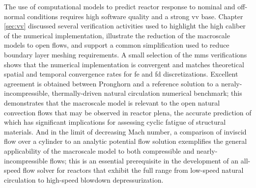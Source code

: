 The use of computational models to predict reactor response to nominal and off-normal conditions requires high software quality and a strong \gls{vv} base. Chapter \ref{sec:vv} discussed several verification activities used to highlight the high caliber of the numerical implementation, illustrate the reduction of the macroscale models to open flows, and support a common simplification used to reduce boundary layer meshing requirements. A small selection of the \gls{mms} verifications shows that the numerical implementation is convergent and matches theoretical spatial and temporal convergence rates for \gls{fe} and \gls{fd} discretizations. Excellent agreement is obtained between Pronghorn and a reference solution to a neraly-incompressible, thermally-driven natural circulation numerical benchmark; this demonstrates that the macroscale model is relevant to the open natural convection flows that may be observed in reactor plena, the accurate prediction of which has significant implications for assessing cyclic fatigue of structural materials. And in the limit of decreasing Mach number, a comparison of inviscid flow over a cylinder to an analytic potential flow solution exemplifies the general applicability of the macroscale model to both compressible and nearly-incompressible flows; this is an essential prerequisite in the development of an all-speed flow solver for reactors that exhibit the full range from low-speed natural circulation to high-speed blowdown depressurization.





